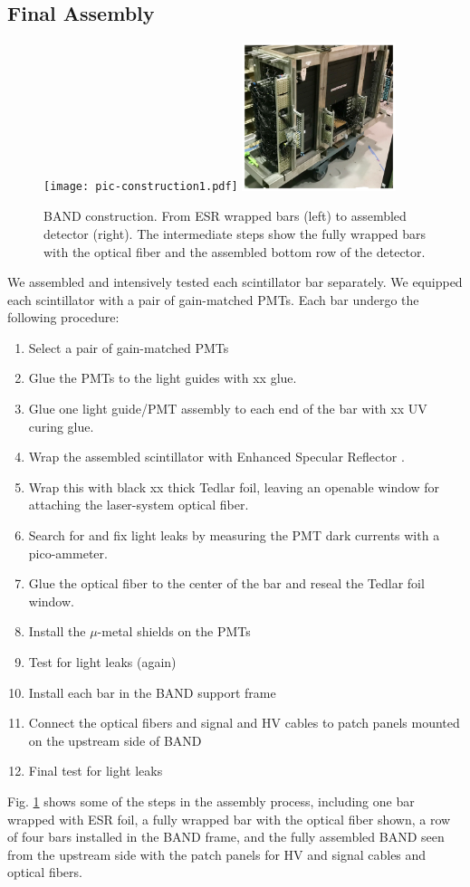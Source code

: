 \documentclass[3p,final,twocolumn]{elsarticle}
\begin{document}
\subsection{Final Assembly}
\label{sec:assembly}
\begin{figure}[tb]
	\centering
	\texttt{[image: pic-construction1.pdf]}
	\includegraphics[width=0.40\textwidth , height=0.40\textwidth]{pic-construction2.pdf}
				\caption{BAND construction. From ESR \cite{3MESR} wrapped bars (left) to assembled detector (right). The intermediate steps show the fully wrapped bars with the optical fiber and the assembled bottom row of the detector.}
		\label{fig:barassembly}
\end{figure}
We assembled and intensively tested each scintillator bar
separately. We equipped each scintillator with a pair of gain-matched
PMTs.  Each bar undergo the following procedure:
\begin{enumerate}
\item Select a pair of gain-matched PMTs
\item Glue the PMTs to the light guides with xx glue.
\item Glue one light guide/PMT assembly to each end of the bar with xx
  UV curing glue.
\item Wrap the assembled scintillator with Enhanced Specular Reflector \cite{3MESR}.
\item Wrap this with black xx thick Tedlar foil, leaving an openable
  window for attaching the laser-system optical fiber.
\item Search for and fix light leaks by measuring the PMT dark currents with a pico-ammeter.
\item Glue the optical fiber to the center of the bar and reseal the Tedlar foil window.
\item Install the $\mu$-metal shields on the PMTs 
\item Test for light leaks (again)
\item Install each bar in the BAND support frame
\item Connect the optical fibers and signal and HV cables to patch panels mounted on the upstream side of BAND
\item Final test for light leaks
\end{enumerate}
Fig. \ref{fig:barassembly} shows some of the steps in the assembly process,
including one bar wrapped with ESR foil, a fully wrapped bar with the
optical fiber shown, a row of four bars installed in the BAND frame,
and the fully assembled BAND seen from the upstream side with the
patch panels for HV and  signal cables and optical fibers.
\end{document}
